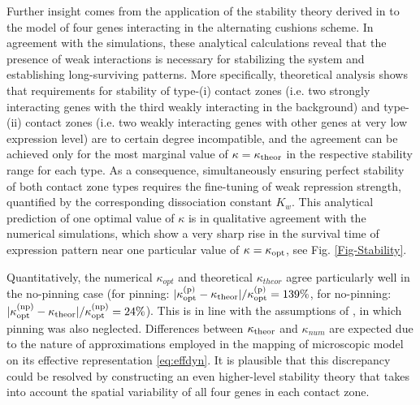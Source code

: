 \documentclass[a4paper,10pt]{article}
\begin{document}
Further insight comes from the application of the stability theory derived in \cite{Majka2023} to the model of four genes interacting in the alternating cushions scheme. In agreement with the simulations, these analytical calculations reveal that the presence of weak interactions is necessary for stabilizing the system and establishing long-surviving patterns. More specifically, theoretical analysis shows that requirements for stability of type-(i) contact zones (i.e. two strongly interacting genes with the third weakly interacting in the background) and type-(ii) contact zones (i.e. two weakly interacting genes with other genes at very low expression level) are to certain degree incompatible, and the agreement can be achieved only for the most marginal value of $\kappa=\kappa_{\rm theor}$ in the respective stability range for each type. As a consequence, simultaneously ensuring perfect stability of both contact zone types requires the fine-tuning of weak repression strength, quantified by the corresponding dissociation constant $K_w$. 
This analytical prediction of one optimal value of $\kappa$ is in qualitative agreement with the numerical simulations, which show a very sharp rise in the survival time of expression pattern near one particular value of $\kappa = \kappa_{\rm opt}$, see Fig. \ref{Fig-Stability}. 

\pagebreak
Quantitatively, the numerical $\kappa_{opt}$ and theoretical $\kappa_{theor}$ agree particularly well in the no-pinning case (for pinning: $|\kappa_{\rm opt}^{\rm (p)}-\kappa_{\rm theor}|/\kappa_{\rm opt}^{\rm (p)}=139\%$, for no-pinning: $|\kappa_{\rm opt}^{\rm (np)}-\kappa_{\rm theor}|/\kappa_{\rm opt}^{\rm (np)}=24\%$). This is in line with the assumptions of \cite{Majka2023}, in which pinning was also neglected. Differences between $\kappa_{\rm theor}$ and $\kappa_{num}$ are expected due to the nature of approximations employed in the mapping of microscopic model on its effective representation \eqref{eq:effdyn}. It is plausible that this discrepancy could be resolved by constructing an even higher-level stability theory that takes into account the spatial variability of all four genes in each contact zone.
\end{document}
